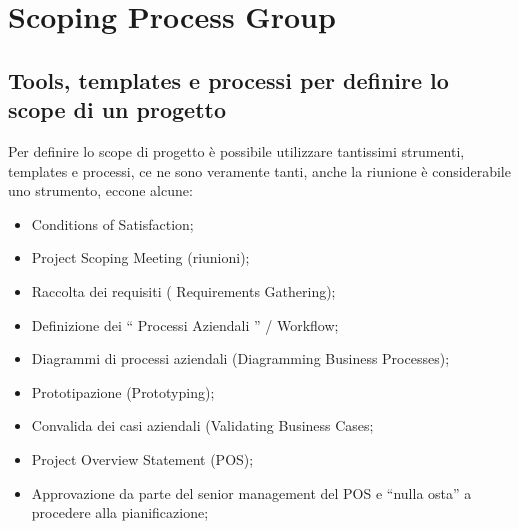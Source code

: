 \section{Scoping Process Group}
\subsection{Tools, templates e processi per definire lo scope di un progetto}
Per definire lo scope di progetto è possibile utilizzare tantissimi strumenti, templates e processi, ce ne sono veramente tanti, anche la riunione è considerabile uno strumento, eccone alcune:
\begin{itemize}
	\item Conditions of Satisfaction;
	\item Project Scoping Meeting (riunioni);
	\item Raccolta dei requisiti ( Requirements Gathering);
	\item Definizione dei “ Processi Aziendali ” / Workflow;
	\item Diagrammi di processi aziendali (Diagramming Business Processes);
	\item Prototipazione (Prototyping);
	\item Convalida dei casi aziendali (Validating Business Cases;
	\item Project Overview Statement (POS);
	\item Approvazione da parte del senior management del POS e “nulla osta” a procedere alla pianificazione;
\end{itemize}
